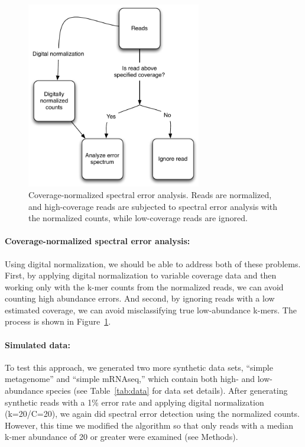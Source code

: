 \documentclass{article}
\begin{document}
\begin{figure}[!ht]
 \centerline{\includegraphics[width=3in]{./figures/coverage-aware-spectrum}}
\caption{Coverage-normalized spectral error analysis.  Reads are normalized,
and high-coverage reads are subjected to spectral error analysis with the
normalized counts, while low-coverage reads are ignored.}
\label{fig:covaware}
\end{figure}

\paragraph{Coverage-normalized spectral error analysis:}

Using digital normalization, we should be able to address both of these
problems.  First, by applying digital normalization to variable
coverage data and then working only with the k-mer counts from the
normalized reads, we can avoid counting high abundance errors.
And second, by ignoring reads with a low estimated coverage, we can
avoid misclassifying true low-abundance k-mers.  The process
is shown in  Figure~\ref{fig:covaware}.


\paragraph{Simulated data:}
To test this approach, we generated two more synthetic data sets,
``simple metagenome'' and ``simple mRNAseq,'' which contain both high-
and low-abundance species (see Table~\ref{tab:data} for data set
details).  After generating synthetic reads with a 1\% error rate and
applying digital normalization (k=20/C=20), we again did spectral
error detection using the normalized counts.  However, this time we
modified the algorithm so that only reads with a median k-mer
abundance of 20 or greater were examined (see Methods).
\end{document}
